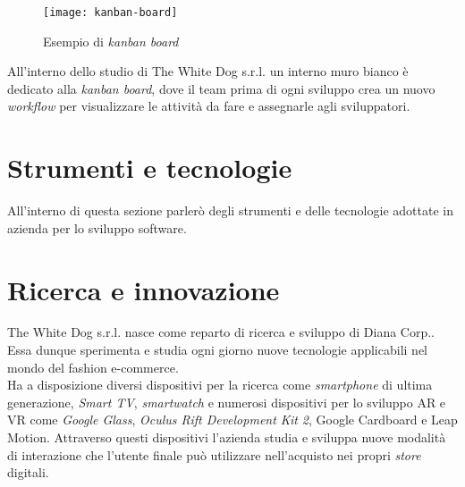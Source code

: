 \label{Kanban}
\begin{figure}[ht]
	\begin{center}
		\texttt{[image: kanban-board]}
		\caption{Esempio di \textit{kanban board}}
	\end{center}
\end{figure}
\FloatBarrier

All'interno dello studio di The White Dog s.r.l. un interno muro bianco è dedicato alla \textit{kanban board}, dove il team prima di ogni sviluppo crea un nuovo \textit{workflow} per visualizzare le attività da fare e assegnarle agli sviluppatori.

\section{Strumenti e tecnologie}

All'interno di questa sezione parlerò degli strumenti e delle tecnologie adottate in azienda per lo sviluppo software.

\section{Ricerca e innovazione}

The White Dog s.r.l. nasce come reparto di ricerca e sviluppo di Diana Corp.. Essa dunque sperimenta e studia ogni giorno nuove tecnologie applicabili nel mondo del fashion e-commerce. \\
Ha a disposizione diversi dispositivi per la ricerca come \textit{smartphone} di ultima generazione, \textit{Smart TV}, \textit{smartwatch} e numerosi dispositivi per lo sviluppo AR e VR come \textit{Google Glass}, \textit{Oculus Rift Development Kit 2}, Google Cardboard e Leap Motion. Attraverso questi dispositivi l'azienda studia e sviluppa nuove modalità di interazione che l'utente finale può utilizzare nell'acquisto nei propri \textit{store} digitali.